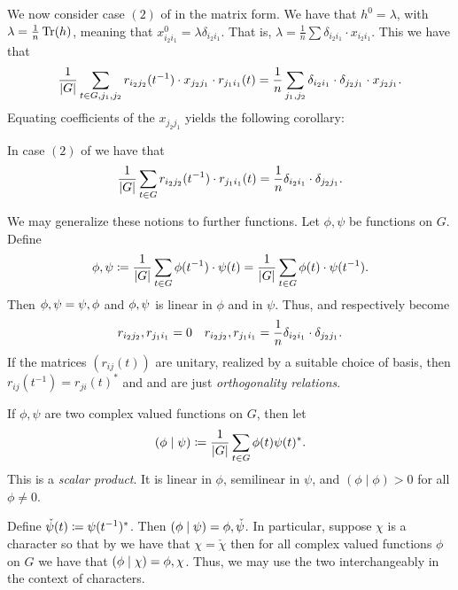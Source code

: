 \documentclass[letterpaper, 11pt, oneside]{book}
\begin{document}
We now consider case $(2)$ of  in the matrix form.
We have that $h^{0} = \lambda$, with $\lambda = \frac{1}{n} \Tr(h)$, meaning that $x_{i_{2}i_{1}}^{0} = \lambda \delta_{i_{2}i_{1}}$.
That is, $\lambda = \frac{1}{n} \sum \delta_{i_{2}i_{1}} \cdot x_{i_{2}i_{1}}$.
This we have that
\[
  \frac{1}{\abs{G}} \sum_{t \in G, j_{1}, j_{2}} r_{i_{2}j_{2}}(t^{-1}) \cdot x_{j_{2}j_{1}} \cdot r_{j_{1}i_{1}}(t) = \frac{1}{n} \sum_{j_{1}, j_{2}} \delta_{i_{2}i_{1}} \cdot \delta_{j_{2}j_{1}} \cdot x_{j_{2}j_{1}}.
\]
Equating coefficients of the $x_{j_{2}j_{1}}$ yields the following corollary:
\begin{cor}\label{cor:schurs_lemma_cor_3}
  In case $(2)$ of  we have that
  \[
    \frac{1}{\abs{G}} \sum_{t \in G} r_{i_{2}j_{2}}(t^{-1}) \cdot r_{j_{1}i_{1}}(t) = \frac{1}{n} \delta_{i_{2}i_{1}} \cdot \delta_{j_{2}j_{1}}.
  \]
\end{cor}

We may generalize these notions to further functions.
Let $\phi, \psi$ be  functions on $G$.
Define
\[
  \inner{\phi , \psi} \defeq \frac{1}{\abs{G}} \sum_{t \in G} \phi(t^{-1}) \cdot \psi(t) = \frac{1}{\abs{G}} \sum_{t \in G} \phi(t) \cdot \psi(t^{-1}).
\]
Then $\inner{\phi , \psi} = \inner{\psi , \phi}$ and $\inner{\phi , \psi}$ is linear in $\phi$ and in $\psi$.
Thus,  and  respectively become
\begin{align*}
  \inner{r_{i_{2}j_{2}}, r_{j_{1}i_{1}}} = 0 && \inner{r_{i_{2}j_{2}}, r_{j_{1}i_{1}}} = \frac{1}{n} \delta_{i_{2}i_{1}} \cdot \delta_{j_{2}j_{1}}.
\end{align*}
If the matrices $(r_{ij}(t))$ are unitary, realized by a suitable choice of basis, then $r_{ij}(t^{-1}) = r_{ji}(t)^{*}$ and  and  are just \emph{orthogonality relations}.

\clearpage

\begin{defn}
  If $\phi, \psi$ are two complex valued functions on $G$, then let
  \[
    (\phi \mid \psi) \coloneqq \frac{1}{\abs{G}} \sum_{t \in G} \phi(t) \psi(t)^{*}.
  \]
  This is a \emph{scalar product}.
  It is linear in $\phi$, semilinear in $\psi$, and $(\phi \mid \phi) > 0$ for all $\phi \neq 0$.
\end{defn}

Define $\check{\psi}(t) \coloneqq \psi(t^{-1})^{*}$.
Then $(\phi \mid \psi) = \inner{\phi, \check{\psi}}$.
In particular, suppose $\chi$ is a character so that by  we have that $\chi = \check{\chi}$ then for all complex valued functions $\phi$ on $G$ we have that $(\phi \mid \chi) = \inner{\phi, \chi}$.
Thus, we may use the two interchangeably in the context of characters.
\end{document}
